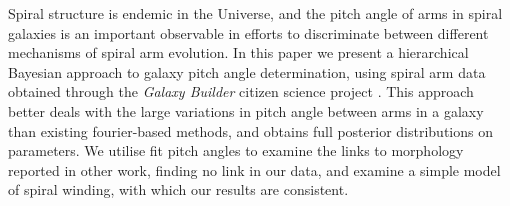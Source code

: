 Spiral structure is endemic in the Universe, and the pitch angle of arms in spiral galaxies is an important observable in efforts to discriminate between different mechanisms of spiral arm evolution. In this paper we present a hierarchical Bayesian approach to galaxy pitch angle determination, using spiral arm data obtained through the \textit{Galaxy Builder} citizen science project {\Lingard}. This approach better deals with the large variations in pitch angle between arms in a galaxy than existing fourier-based methods, and obtains full posterior distributions on parameters. We utilise fit pitch angles to examine the links to morphology reported in other work, finding no link in our data, and examine a simple model of spiral winding, with which our results are consistent.
